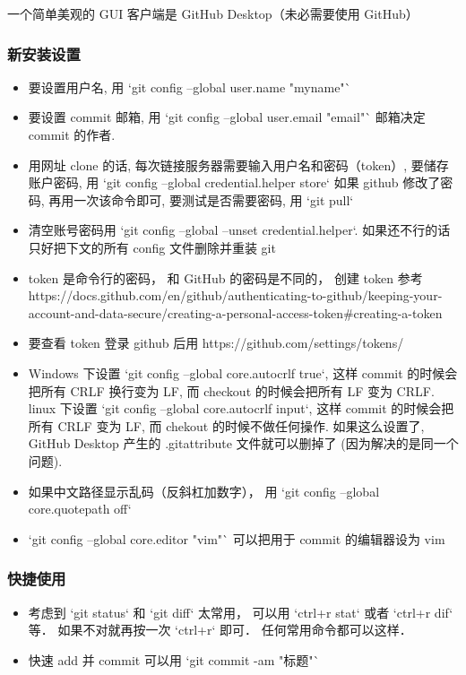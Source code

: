 
\begin{issues}
\issueDraft
\end{issues}


一个简单美观的 GUI 客户端是 GitHub Desktop（未必需要使用 GitHub）

\subsubsection{新安装设置}
\begin{itemize}
\item 要设置用户名, 用 `git config --global user.name "myname"`
\item 要设置 commit 邮箱, 用 `git config --global user.email "email"`  邮箱决定 commit 的作者.
\item 用网址 clone 的话, 每次链接服务器需要输入用户名和密码（token）, 要储存账户密码, 用 `git config --global credential.helper store` 如果 github 修改了密码, 再用一次该命令即可, 要测试是否需要密码, 用 `git pull`
\item 清空账号密码用 `git config --global --unset credential.helper`. 如果还不行的话只好把下文的所有 config 文件删除并重装 git
\item token 是命令行的密码， 和 GitHub 的密码是不同的， 创建 token 参考 https://docs.github.com/en/github/authenticating-to-github/keeping-your-account-and-data-secure/creating-a-personal-access-token#creating-a-token
\item 要查看 token 登录 github 后用 https://github.com/settings/tokens/
\item Windows 下设置 `git config --global core.autocrlf true`, 这样 commit 的时候会把所有 CRLF 换行变为 LF, 而 checkout 的时候会把所有 LF 变为 CRLF. linux 下设置 `git config --global core.autocrlf input`, 这样 commit 的时候会把所有 CRLF 变为 LF, 而 chekout 的时候不做任何操作. 如果这么设置了, GitHub Desktop 产生的 .gitattribute 文件就可以删掉了 (因为解决的是同一个问题).
\item 如果中文路径显示乱码（反斜杠加数字）， 用 `git config --global core.quotepath off`
\item `git config --global core.editor "vim"` 可以把用于 commit 的编辑器设为 vim
\end{itemize}

\subsubsection{快捷使用}
\begin{itemize}
\item 考虑到 `git status` 和 `git diff` 太常用， 可以用 `ctrl+r stat` 或者 `ctrl+r dif` 等． 如果不对就再按一次 `ctrl+r` 即可． 任何常用命令都可以这样．
\item 快速 add 并 commit 可以用 `git commit -am "标题"`
\end{itemize}

